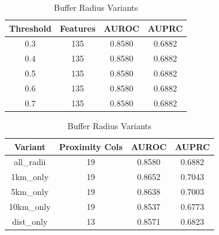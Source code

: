 \begin{table}[ht]
\caption{Sensitivity Analysis}
\centering
\begin{subtable}{\textwidth}
\caption{Drop-NA Threshold}
\begin{tabular}{cccc}
\hline
Threshold & Features & AUROC & AUPRC \\
\hline
0.3 & 135 & 0.8580 & 0.6882 \\
0.4 & 135 & 0.8580 & 0.6882 \\
0.5 & 135 & 0.8580 & 0.6882 \\
0.6 & 135 & 0.8580 & 0.6882 \\
0.7 & 135 & 0.8580 & 0.6882 \\
\hline
\end{tabular}
\end{subtable}
\begin{subtable}{\textwidth}
\caption{Buffer Radius Variants}
\begin{tabular}{cccc}
\hline
Variant & Proximity Cols & AUROC & AUPRC \\
\hline
all_radii & 19 & 0.8580 & 0.6882 \\
1km_only & 19 & 0.8652 & 0.7043 \\
5km_only & 19 & 0.8638 & 0.7003 \\
10km_only & 19 & 0.8537 & 0.6773 \\
dist_only & 13 & 0.8571 & 0.6823 \\
\hline
\end{tabular}
\end{subtable}
\end{table}
